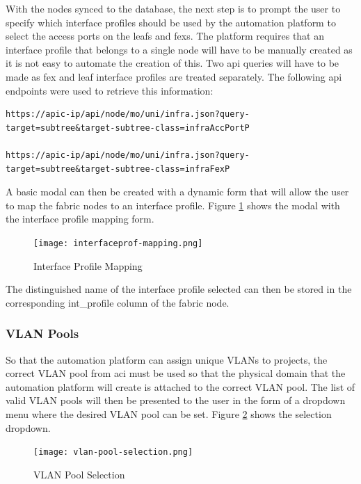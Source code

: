 With the nodes synced to the database, the next step is to prompt the user to specify which interface profiles should be used by the automation platform to select the access ports on the leafs and \gls{fex}s. The platform requires that an interface profile that belongs to a single node will have to be manually created as it is not easy to automate the creation of this. Two \gls{api} queries will have to be made as \gls{fex} and leaf interface profiles are treated separately. The following \gls{api} endpoints were used to retrieve this information:
\begin{verbatim}
https://apic-ip/api/node/mo/uni/infra.json?query-
target=subtree&target-subtree-class=infraAccPortP

https://apic-ip/api/node/mo/uni/infra.json?query-
target=subtree&target-subtree-class=infraFexP
\end{verbatim}

A basic modal can then be created with a dynamic form that will allow the user to map the fabric nodes to an interface profile. Figure \ref{fig:interfaceprof-mapping} shows the modal with the interface profile mapping form.

\begin{figure}[H]
    \centering
    \texttt{[image: interfaceprof-mapping.png]}
    \caption{Interface Profile Mapping}
    \label{fig:interfaceprof-mapping}
\end{figure}

The distinguished name of the interface profile selected can then be stored in the corresponding int\_profile column of the fabric node.

\subsubsection{VLAN Pools}
So that the automation platform can assign unique VLANs to projects, the correct VLAN pool from \gls{aci} must be used so that the physical domain that the automation platform will create is attached to the correct VLAN pool. The list of valid VLAN pools will then be presented to the user in the form of a dropdown menu where the desired VLAN pool can be set. Figure \ref{fig:vlan-pool-selection} shows the selection dropdown.

\begin{figure}[H]
    \centering
    \texttt{[image: vlan-pool-selection.png]}
    \caption{VLAN Pool Selection}
    \label{fig:vlan-pool-selection}
\end{figure}

